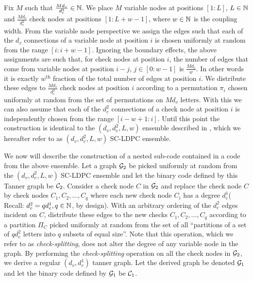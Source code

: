 Fix $M$ such that $\frac{Md_{v}}{d_{c}^{2}}\in \mathbb{N}$. We place $M$ variable nodes at positions $[1: L]$, $L\in\mathbb{N}$ and $\frac{Md_{v}}{d_{c}^{2}}$ check nodes at positions $[1 : L+w-1]$, where $w\in \mathbb{N}$ is the coupling width. From the variable node perspective we assign the edges such that each of the $d_{v}$ connections of a variable node at position $i$ is chosen uniformly at random from the range $[i : i+w-1]$. Ignoring the boundary effects, the above assignments are such that, for check nodes  at position $i$, the number of edges that come from variable nodes at position $i-j$, $j\in[0:w-1]$ is $\frac{Md_{v}}{w}$. In other words it is exactly $w^{\text{th}}$ fraction of the total number of edges at position $i$. We distribute these edges to $\frac{Md_{v}}{d_{c}^{2}}$ check nodes at position $i$ according to a permutation $\pi_{i}$ chosen uniformly at random from the set of permutations on $Md_{v}$ letters. With this we can also assume that each of the $d_{c}^{2}$ connections of a check node at position $i$ is independently chosen from the range $[i-w+1 : i]$. Until this point the construction is identical to the $(d_{v},d_{c}^{2},L,w)$ ensemble described in \cite{KudekarUrbanke11}, which we hereafter refer to as $(d_{v},d_{c}^{2},L,w)$ SC-LDPC ensemble. 

We now will describe the construction of a nested sub-code contained in a code from the above ensemble. Let a graph $\mathcal{G}_{2}$ be picked uniformly at random from the  $(d_{v},d_{c}^{2},L,w)$ SC-LDPC ensemble and let the binary code defined by this Tanner graph be $\mathcal{C}_{2}$. Consider a check node $C$ in $\mathcal{G}_{2}$ and
replace the check node $C$ by check nodes $C_{1}, C_{2}, \ldots, C_{q}$ where each new check node $C_{i}$ has a degree $d_{c}^{1}$( Recall: $d_{c}^{2}=q d_{c}^{1},q\in \mathbb{N}$, by design). With an arbitrary ordering of the $d_{c}^{2}$ edges incident on $C$, distribute these edges to the new checks $C_{1}, C_{2}, \ldots, C_{q}$ according to a partition $\Pi_{C}$ picked uniformly at random from the set of all ``partitions of a set of $qd_{c}^{2}$ letters into $q$ subsets of equal size''. 
Note that this operation, which we refer to as \textit{check-splitting}, does not alter the degree of  any variable node in the graph. By performing the \textit{check-splitting} operation on all the check nodes in $\mathcal{G}_{2}$, we derive a regular $(d_{v},d_{c}^{1})$ tanner graph. Let the derived graph be denoted $\mathcal{G}_{1}$ and let the binary code defined by $\mathcal{G}_{1}$ be $\mathcal{C}_{1}$.

